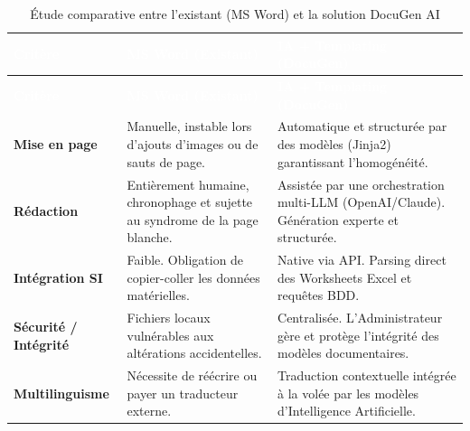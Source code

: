 \documentclass[12pt, a4paper]{report}
\begin{document}
\begin{longtable}{|p{3cm}|p{5cm}|p{\dimexpr\textwidth-8.8cm}|}
    
    \hline
    \rowcolor{SecColor}
    \textcolor{white}{\textbf{Critère}} &\textcolor{white}{\textbf{MS Word (Existant)}} &\textcolor{white}{\textbf{IA + Templating (DocuGen)}} \\ \hline
    \endfirsthead

    \hline
    \rowcolor{SecColor}
    \textcolor{white}{\textbf{Critère}} &\textcolor{white}{\textbf{MS Word (Existant)}} &\textcolor{white}{\textbf{IA + Templating (DocuGen)}} \\ \hline
    \endhead
    \hline
    \endfoot

    \hline
    \caption{Étude comparative entre l'existant (MS Word) et la solution DocuGen AI} 
    \label{tab:etude_comparative}
    \endlastfoot

    \textbf{Mise en page} & Manuelle, instable lors d'ajouts d'images ou de sauts de page. & Automatique et structurée par des modèles (Jinja2) garantissant l'homogénéité. \\ \hline
    
    \textbf{Rédaction} & Entièrement humaine, chronophage et sujette au syndrome de la page blanche. & Assistée par une orchestration multi-LLM (OpenAI/Claude). Génération experte et structurée. \\ \hline
    
    \textbf{Intégration SI} & Faible. Obligation de copier-coller les données matérielles. & Native via API. Parsing direct des Worksheets Excel et requêtes BDD. \\ \hline
    
    \textbf{Sécurité / Intégrité} & Fichiers locaux vulnérables aux altérations accidentelles. & Centralisée. L'Administrateur gère et protège l'intégrité des modèles documentaires. \\ \hline
    
    \textbf{Multilinguisme} & Nécessite de réécrire ou payer un traducteur externe. & Traduction contextuelle intégrée à la volée par les modèles d'Intelligence Artificielle. \\ 
\end{longtable}
\end{document}
